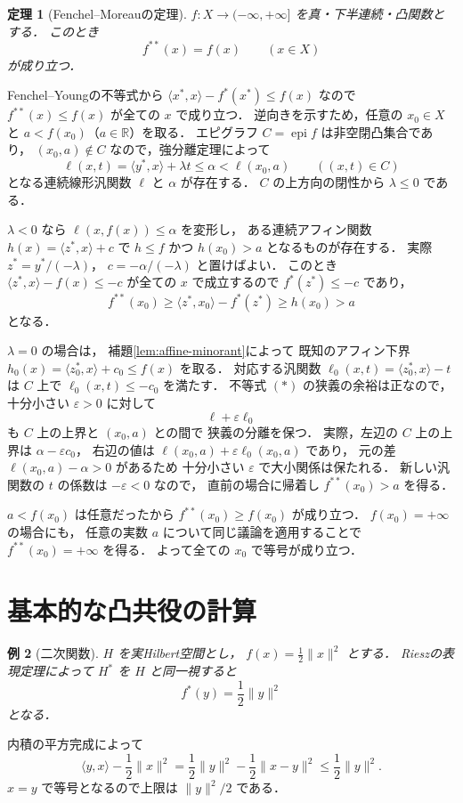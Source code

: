 \documentclass[a5paper,10pt,onecolumn]{jsarticle}
\makeatletter
\theoremstyle{mathnotetheorem}
\newtheorem{theorem}{定理}[section]
\newtheorem{example}[theorem]{例}
\renewcommand{\proofname}{証明}
\renewenvironment{proof}[1][\proofname]{%
  \par\pushQED{\qed}\normalfont\topsep4\p@\@plus2\p@\relax
  \trivlist\item[\hskip\labelsep\bfseries #1]\ignorespaces
}{\popQED\endtrivlist\@endpefalse}
\newcommand{\norm}[1]{\lVert #1\rVert}
\makeatother
\begin{document}
\begin{theorem}[Fenchel--Moreauの定理]\label{thm:fenchel-moreau}
$f:X\to(-\infty,+\infty]$ を真・下半連続・凸関数とする．
このとき
\[
 f^{**}(x)=f(x)\qquad(x\in X)
\]
が成り立つ．
\end{theorem}
\begin{proof}
Fenchel--Youngの不等式から
$\langle x^*,x\rangle-f^*(x^*)\le f(x)$ なので
$f^{**}(x)\le f(x)$ が全ての $x$ で成り立つ．
逆向きを示すため，任意の $x_0\in X$ と
$a<f(x_0)$（$a\in\mathbb R$）を取る．
エピグラフ $C=\operatorname{epi}f$ は非空閉凸集合であり，
$(x_0,a)\notin C$ なので，強分離定理によって
\[
 \ell(x,t)=\langle y^*,x\rangle+\lambda t
 \le\alpha<\ell(x_0,a)
 \qquad((x,t)\in C)
 \tag{$*$}
\]
となる連続線形汎関数 $\ell$ と $\alpha$ が存在する．
$C$ の上方向の閉性から $\lambda\le0$ である．

$\lambda<0$ なら
$\ell(x,f(x))\le\alpha$ を変形し，
ある連続アフィン関数
$h(x)=\langle z^*,x\rangle+c$ で
$h\le f$ かつ $h(x_0)>a$ となるものが存在する．
実際
$z^*=y^*/(-\lambda)$，
$c=-\alpha/(-\lambda)$ と置けばよい．
このとき
$\langle z^*,x\rangle-f(x)\le-c$ が全ての $x$ で成立するので
$f^*(z^*)\le-c$ であり，
\[
 f^{**}(x_0)\ge\langle z^*,x_0\rangle-f^*(z^*)
 \ge h(x_0)>a
\]
となる．

$\lambda=0$ の場合は，
補題\ref{lem:affine-minorant}によって
既知のアフィン下界
$h_0(x)=\langle z_0^*,x\rangle+c_0\le f(x)$ を取る．
対応する汎関数
$\ell_0(x,t)=\langle z_0^*,x\rangle-t$
は $C$ 上で $\ell_0(x,t)\le-c_0$ を満たす．
不等式 $(*)$ の狭義の余裕は正なので，
十分小さい $\varepsilon>0$ に対して
\[
 \ell+\varepsilon\ell_0
\]
も $C$ 上の上界と $(x_0,a)$ との間で
狭義の分離を保つ．
実際，左辺の $C$ 上の上界は
$\alpha-\varepsilon c_0$，
右辺の値は
$\ell(x_0,a)+\varepsilon\ell_0(x_0,a)$ であり，
元の差 $\ell(x_0,a)-\alpha>0$ があるため
十分小さい $\varepsilon$ で大小関係は保たれる．
新しい汎関数の $t$ の係数は $-\varepsilon<0$ なので，
直前の場合に帰着し $f^{**}(x_0)>a$ を得る．

$a<f(x_0)$ は任意だったから
$f^{**}(x_0)\ge f(x_0)$ が成り立つ．
$f(x_0)=+\infty$ の場合にも，
任意の実数 $a$ について同じ議論を適用することで
$f^{**}(x_0)=+\infty$ を得る．
よって全ての $x_0$ で等号が成り立つ．
\end{proof}

\section{基本的な凸共役の計算}

\begin{example}[二次関数]\label{ex:quadratic}
$H$ を実Hilbert空間とし，
$f(x)=\frac12\norm x^2$ とする．
Rieszの表現定理によって $H^*$ を $H$ と同一視すると
\[
 f^*(y)=\frac12\norm y^2
\]
となる．
\end{example}
\begin{proof}
内積の平方完成によって
\[
 \langle y,x\rangle-\frac12\norm x^2
 =\frac12\norm y^2-\frac12\norm{x-y}^2
 \le\frac12\norm y^2.
\]
$x=y$ で等号となるので上限は $\norm y^2/2$ である．
\end{proof}
\end{document}
